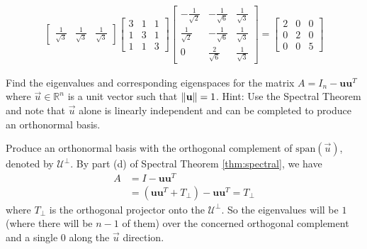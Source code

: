 \begin{Answer}
\begin{enumerate}[label=(\alph*)]
\begin{align*}
\begin{bmatrix}
\frac{1}{\sqrt{3}} & \frac{1}{\sqrt{3}} & \frac{1}{\sqrt{3}}
\end{bmatrix}
\begin{bmatrix}
3 & 1 & 1\\
1 & 3 & 1\\
1 & 1 & 3
\end{bmatrix}
\begin{bmatrix}
-\frac{1}{\sqrt{2}} & -\frac{1}{\sqrt{6}} & \frac{1}{\sqrt{3}}\\
\frac{1}{\sqrt{2}} & -\frac{1}{\sqrt{6}} & \frac{1}{\sqrt{3}}\\
0 & \frac{2}{\sqrt{6}} & \frac{1}{\sqrt{3}}
\end{bmatrix}
=
\begin{bmatrix}
2 & 0 & 0\\
0 & 2 & 0\\
0 & 0 & 5
\end{bmatrix}
\end{align*}
\end{enumerate}
\end{Answer}

\begin{Exercise}
Find the eigenvalues and corresponding eigenspaces for the matrix $A = I_n - \textbf{u}\textbf{u}^T$ where $\vec{u} \in \mathbb{R}^n$ is a unit vector such that $\norm{\textbf{u}} = 1$. Hint: Use the Spectral Theorem and note that $\vec{u}$ alone is linearly independent and can be completed to produce an orthonormal basis.
\end{Exercise}
\begin{Answer}
Produce an orthonormal basis with the orthogonal complement of $\text{span}(\vec{u})$, denoted by $\mathcal{U}^\perp$. By part (d) of Spectral Theorem \ref{thm:spectral}, we have 
\begin{align*}
A &= I - \textbf{u}\textbf{u}^T \\ 
&= (\textbf{u}\textbf{u}^T + T_{\perp}) - \textbf{u}\textbf{u}^T = T_{\perp}
\end{align*}
where $T_{\perp}$ is the orthogonal projector onto the $\mathcal{U}^\perp$. So the eigenvalues will be $1$ (where there will be $n-1$ of them) over the concerned orthogonal complement and a single $0$ along the $\vec{u}$ direction.
\end{Answer}


